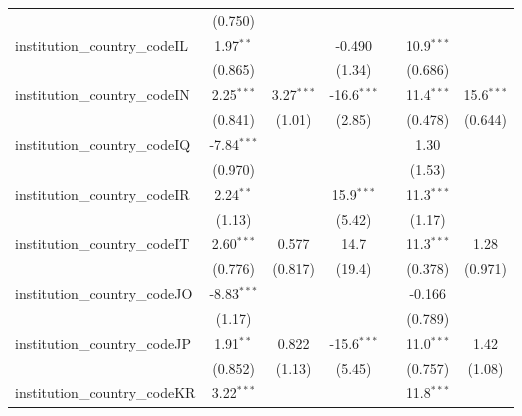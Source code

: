 \begin{tabular}{lcccccc}
                                         & (0.750)        &               &               &            &               &   \\   
   institution\_country\_codeIL          & 1.97$^{**}$    &               & -0.490        &            & 10.9$^{***}$  &   \\   
                                         & (0.865)        &               & (1.34)        &            & (0.686)       &   \\   
   institution\_country\_codeIN          & 2.25$^{***}$   & 3.27$^{***}$  & -16.6$^{***}$ &            & 11.4$^{***}$  & 15.6$^{***}$\\   
                                         & (0.841)        & (1.01)        & (2.85)        &            & (0.478)       & (0.644)\\   
   institution\_country\_codeIQ          & -7.84$^{***}$  &               &               &            & 1.30          &   \\   
                                         & (0.970)        &               &               &            & (1.53)        &   \\   
   institution\_country\_codeIR          & 2.24$^{**}$    &               & 15.9$^{***}$  &            & 11.3$^{***}$  &   \\   
                                         & (1.13)         &               & (5.42)        &            & (1.17)        &   \\   
   institution\_country\_codeIT          & 2.60$^{***}$   & 0.577         & 14.7          &            & 11.3$^{***}$  & 1.28\\   
                                         & (0.776)        & (0.817)       & (19.4)        &            & (0.378)       & (0.971)\\   
   institution\_country\_codeJO          & -8.83$^{***}$  &               &               &            & -0.166        &   \\   
                                         & (1.17)         &               &               &            & (0.789)       &   \\   
   institution\_country\_codeJP          & 1.91$^{**}$    & 0.822         & -15.6$^{***}$ &            & 11.0$^{***}$  & 1.42\\   
                                         & (0.852)        & (1.13)        & (5.45)        &            & (0.757)       & (1.08)\\   
   institution\_country\_codeKR          & 3.22$^{***}$   &               &               &            & 11.8$^{***}$  &   \\   

\end{tabular}
